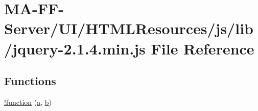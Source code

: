 \hypertarget{_u_i_2_h_t_m_l_resources_2js_2lib_2jquery-2_81_84_8min_8js}{}\section{M\+A-\/\+F\+F-\/\+Server/\+U\+I/\+H\+T\+M\+L\+Resources/js/lib/jquery-\/2.1.4.min.\+js File Reference}
\label{_u_i_2_h_t_m_l_resources_2js_2lib_2jquery-2_81_84_8min_8js}
\subsection*{Functions}
\begin{DoxyCompactItemize}
\item 
\hyperlink{_u_i_2_h_t_m_l_resources_2js_2lib_2jquery-2_81_84_8min_8js_a43f0b96ea8ec44ca20ba86809a785614}{!function} (\hyperlink{_u_i_2_h_t_m_l_resources_2js_2lib_2bootstrap_8min_8js_a1f5870dcf487187f13d5fd328ed9e6e7}{a}, \hyperlink{_u_i_2_h_t_m_l_resources_2js_2lib_2bootstrap_8min_8js_a398bb8542498d1b14178b02b99df309b}{b})
\item 

\end{DoxyCompactItemize}
